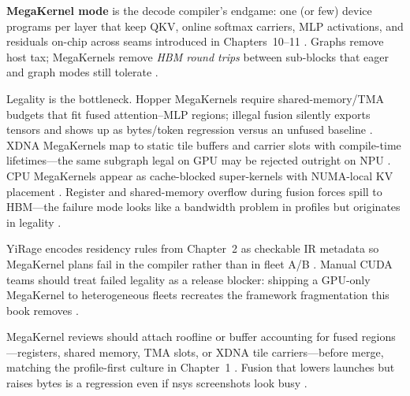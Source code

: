 \textbf{MegaKernel mode} is the decode compiler's endgame: one (or few) device programs per layer that keep QKV, online softmax carriers, MLP activations, and residuals on-chip across seams introduced in Chapters~10--11 \citep{dao2022flashattention,yirage2026,taxbreak2026}. Graphs remove host tax; MegaKernels remove \emph{HBM round trips} between sub-blocks that eager and graph modes still tolerate \citep{memoryfloor2026,patel2025llminference}.

Legality is the bottleneck. Hopper MegaKernels require shared-memory/TMA budgets that fit fused attention--MLP regions; illegal fusion silently exports tensors and shows up as bytes/token regression versus an unfused baseline \citep{nvidia2022hopper,semianalysis2024tma,memoryfloor2026}. XDNA MegaKernels map to static tile buffers and carrier slots with compile-time lifetimes---the same subgraph legal on GPU may be rejected outright on NPU \citep{amd2024xdna,amd2024aie,yirage2026}. CPU MegaKernels appear as cache-blocked super-kernels with NUMA-local KV placement \citep{dlbook,chen2020compilerbasedhardw}. Register and shared-memory overflow during fusion forces spill to HBM---the failure mode looks like a bandwidth problem in profiles but originates in legality \citep{memoryfloor2026,semianalysis2024tma,patel2025llminference,yirage2026,chen2020compilerbasedhardw,amd2024xdna,amd2024aie,nvidia2022hopper,taxbreak2026,dao2022flashattention,kwon2023vllm,liu2024deepseekv3,dlbook,dao2023flashdecoding,nvidia2024cudagraphs}.

YiRage encodes residency rules from Chapter~2 as checkable IR metadata so MegaKernel plans fail in the compiler rather than in fleet A/B \citep{yirage2026,chen2020compilerbasedhardw,liu2024deepseekv3}. Manual CUDA teams should treat failed legality as a release blocker: shipping a GPU-only MegaKernel to heterogeneous fleets recreates the framework fragmentation this book removes \citep{patel2025llminference,kwon2023vllm}.

MegaKernel reviews should attach roofline or buffer accounting for fused regions---registers, shared memory, TMA slots, or XDNA tile carriers---before merge, matching the profile-first culture in Chapter~1 \citep{memoryfloor2026,semianalysis2024tma,patel2025llminference,amd2024aie,amd2024xdna,nvidia2022hopper,yirage2026,chen2020compilerbasedhardw,dao2022flashattention,taxbreak2026,nvidia2024cudagraphs,kwon2023vllm,liu2024deepseekv3,dlbook,dao2023flashdecoding}. Fusion that lowers launches but raises bytes is a regression even if nsys screenshots look busy \citep{taxbreak2026,memoryfloor2026}.

